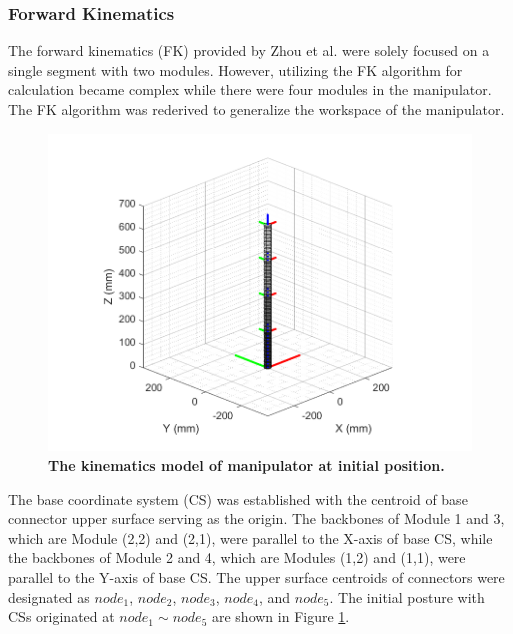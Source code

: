 \subsubsection{Forward Kinematics}
The forward kinematics (FK) provided by Zhou et al. \cite{fishboneCR} were solely focused on a single segment 
with two modules. However, utilizing the FK algorithm for calculation became complex while there were four modules in 
the manipulator. The FK algorithm was rederived to generalize the workspace of the manipulator. 
\begin{figure}[H] %
    \centering
    \captionsetup{labelsep=colon}
    \includegraphics[width=1.0\textwidth]{Image/MATLAB/manipulator_0_0_0_0.png} 
    \caption[The kinematics model of manipulator at the initial position]
    {\centering \textbf{The kinematics model of manipulator at initial position.}}
    \label{fig:kinematics model 0_0_0_0}
\end{figure}
The base coordinate system (CS) was established with the centroid of base connector upper surface serving as 
the origin. The backbones of Module 1 and 3, which are Module (2,2) and (2,1), were parallel to the X-axis 
of base CS, while the backbones of Module 2 and 4, which are Modules (1,2) and (1,1), were parallel to the 
Y-axis of base CS. The upper surface centroids of connectors were designated as $node_1$, $node_2$, $node_3$, 
$node_4$, and $node_5$. The initial posture with CSs originated at $node_1 \sim node_5 $ are shown in 
Figure \ref{fig:kinematics model 0_0_0_0}. 

